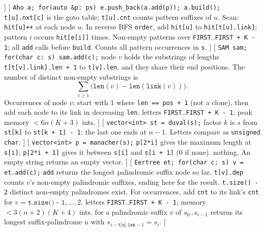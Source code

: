 ]\label{suffixarray}
[
	 \texttt{Aho a; for(auto \&p: ps) e.push\_back(a.add(p)); a.build();}
	 \texttt{t[u].nxt[c]} is the goto table; \texttt{t[u].cnt} counts pattern suffixes of $u$.
	Scan: \texttt{hit[u]++} at each node $u$.
	In reverse BFS \texttt{order}, add \texttt{hit[u]} to \texttt{hit[t[u].link]}; pattern $i$ occurs \texttt{hit[e[i]]} times.
	 Non-empty patterns over \texttt{FIRST}..\texttt{FIRST + K - 1}; all \texttt{add} calls before \texttt{build}.
	 Counts all pattern occurrences in \texttt{s}.
]\label{ahocorasick}
[
	 \texttt{SAM sam; for(char c: s) sam.add(c);}
	 node $v$ holds the substrings of lengths \texttt{t[t[v].link].len + 1} to \texttt{t[v].len}, and they share their end positions.
	The number of distinct non-empty substrings is
	\[ \textstyle\sum_{v \ge 1} \bigl(\texttt{len}(v) - \texttt{len}(\texttt{link}(v))\bigr). \]
	Occurrences of node $v$: start with 1 where \texttt{len == pos + 1} (not a clone), then add each node to its link in decreasing \texttt{len}.
	 letters \texttt{FIRST}..\texttt{FIRST + K - 1}; peak memory $< 6n(K + 3)$ ints.
]\label{suffixautomaton}
[
	 \texttt{vector<int> st = duval(s);}
	 factor $k$ is $s$ from \texttt{st[k]} to \texttt{st[k + 1] - 1}; the last one ends at $n - 1$. Letters compare as \texttt{unsigned char}.
]\label{lyndon}
[
	 \texttt{vector<int> p = manacher(s);}
	 \texttt{p[2*i]} gives the maximum length at \texttt{s[i]}; \texttt{p[2*i + 1]} gives it between \texttt{s[i]} and \texttt{s[i + 1]} (0 if none).
	 nothing. An empty string returns an empty vector.
]\label{manacher}
[
	 \texttt{Eertree et; for(char c: s) v = et.add(c);}
	 \texttt{add} returns the longest palindromic suffix node so far.
	\texttt{t[v].dep} counts $v$'s non-empty palindromic suffixes, ending here for the result.
	\texttt{t.size() - 2} distinct non-empty palindromes exist.
	For occurrences, add \texttt{cnt} to its link's \texttt{cnt} for $v = \texttt{t.size() - 1},\ldots,2$.
	 letters \texttt{FIRST}..\texttt{FIRST + K - 1}; memory $< 3(n + 2)(K + 4)$ ints.
	 for a palindromic suffix $v$ of $s_0..s_{i-1}$ returns its longest suffix-palindrome $u$ with $s_{i-\texttt{t[u].len}-1} = s_i$.
]\label{eertree}
